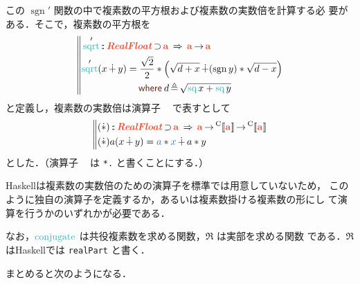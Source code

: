 \documentclass[a5paper,twoside,fleqn,draft]{jsbook}
\def\[{[\![}
\def\]{]\!]}
\DeclareMathOperator{\sgn}{sgn}
\def\keywordColor{Sepia}
\def\varColor{NavyBlue}
\def\funcColor{BlueGreen}
\def\typeColor{RedOrange}
\newcommand{\programminglanguage}[1]{\textsf{#1}}
\newcommand{\haskell}{\programminglanguage{Haskell}}
\newcommand{\code}[1]{\texttt{#1}}
\newenvironment{haskellcode}{\begin{itembox}[r]{\haskell}}{\end{itembox}}
\newcommand{\mBrace}{\Vert}
\newcommand{\mKeyword}[1]{\textcolor{\keywordColor}{\mathsf{#1}}}
\newcommand{\mWhereKeyword}{\mKeyword{where}}
\DeclareMathOperator{\mSuperClass}{\;\Rightarrow\;}
\DeclareMathOperator{\mSuperSet}{\supset}
\newcommand{\mVar}[1]{\textcolor{\varColor}{#1}}
\newcommand{\mAVar}{{\mVar{a}}}
\newcommand{\mXVar}{\mVar{x}}
\newcommand{\mSpecialFunc}[1]{\textcolor{\funcColor}{\textrm{#1}}}
\DeclareMathOperator{\mConjugate}{\mSpecialFunc{conjugate}}
\DeclareMathOperator{\mSq}{\mSpecialFunc{sq}}
\DeclareMathOperator{\mSqrt}{\mSpecialFunc{sqrt}}
\DeclareMathOperator{\mComplexPlus}{\dotplus}
\DeclareMathOperator{\mComplexTimes}{\Dot\ast}
\DeclareMathOperator{\mFuncArrow}{\rightarrow}
\DeclareMathOperator{\mIn}{{:\!:}}
\DeclareMathOperator{\mLetEq}{\triangleq}
\newcommand{\mType}[1]{\textcolor{\typeColor}{\mathbf{#1}}}
\newcommand{\mA}{\mType{a}}
\newcommand{\mTypeAssemble}[2]{{}^\mathrm{#1}\[\mType{#2}\]}
\newcommand{\mCompFunclexType}[1]{\mTypeAssemble{C}{#1}} %
\newcommand{\mTypeClass}[1]{\textcolor{\typeColor}{\textbf{\textit{#1}}}}
\newcommand{\mRealFloatTypeClass}{\mTypeClass{RealFloat}}
\newcommand{\mProjEXP}[2]{#1\mFuncArrow#2} %
\newcommand{\mWhereIsEXP}[2]{\mathbin{\mWhereKeyword}#1\mLetEq#2} %
\begin{document}
この $\sgn'$ 関数の中で複素数の平方根および複素数の実数倍を計算する必
要がある．そこで，複素数の平方根を
\begin{equation}
  \left\mBrace
  \begin{aligned}
    &\mSqrt'\mIn\mRealFloatTypeClass\mSuperSet\mA
    \mSuperClass\mProjEXP{\mA }{\mA }\\
    &\begin{aligned}
       \mSqrt'(x\mComplexPlus y)
       &=\frac{\sqrt{2}}{2}*\left(\sqrt{d+x}\mComplexPlus(\sgn y)*\sqrt{d-x}\right)\\
       &\quad\mWhereIsEXP{d}{\sqrt{\mSq x+\mSq y}}
     \end{aligned}
  \end{aligned}
  \right.
\end{equation}
と定義し，複素数の実数倍は演算子 $\mComplexTimes$ で表すとして
\begin{equation}
  \left\mBrace
  \begin{aligned}
    &(\mComplexTimes)\mIn\mRealFloatTypeClass\mSuperSet\mA \mSuperClass
    \mProjEXP{\mA }{\mProjEXP{\mCompFunclexType{a}}{\mCompFunclexType{a}}}\\
    &(\mComplexTimes)a(x\mComplexPlus y)=\mAVar*\mXVar\mComplexPlus a*y
  \end{aligned}
  \right.
\end{equation}
とした．（演算子 $\mComplexTimes$ は \code{*.} と書くことにする．）

\haskell は複素数の実数倍のための演算子を標準では用意していないため，
このように独自の演算子を定義するか，あるいは複素数掛ける複素数の形にし
て演算を行うかのいずれかが必要である．


なお，$\mConjugate$ は共役複素数を求める関数，$\Re$ は実部を求める関数
である．$\Re$ は\haskell では \code{realPart} と書く．

まとめると次のようになる．
\end{document}
